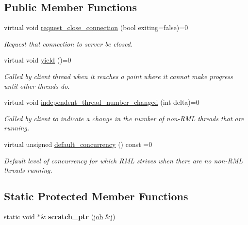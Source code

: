 \subsection*{Public Member Functions}
\begin{DoxyCompactItemize}
\item 
virtual void \hyperlink{classrml_1_1server_a3119d8d6c2d17932610653f6fda4f87a}{request\+\_\+close\+\_\+connection} (bool exiting=false)=0
\begin{DoxyCompactList}\small\item\em Request that connection to server be closed. \end{DoxyCompactList}\item 
\hypertarget{classrml_1_1server_a53e1efc4cb441f962e14af14e49b9fba}{}virtual void \hyperlink{classrml_1_1server_a53e1efc4cb441f962e14af14e49b9fba}{yield} ()=0\label{classrml_1_1server_a53e1efc4cb441f962e14af14e49b9fba}

\begin{DoxyCompactList}\small\item\em Called by client thread when it reaches a point where it cannot make progress until other threads do. \end{DoxyCompactList}\item 
virtual void \hyperlink{classrml_1_1server_a45154e61e7c6b60b51d53dacd1d03c2f}{independent\+\_\+thread\+\_\+number\+\_\+changed} (int delta)=0
\begin{DoxyCompactList}\small\item\em Called by client to indicate a change in the number of non-\/\+R\+M\+L threads that are running. \end{DoxyCompactList}\item 
virtual unsigned \hyperlink{classrml_1_1server_a0a4a81b5f45651f8c02f0227bbe49167}{default\+\_\+concurrency} () const  =0
\begin{DoxyCompactList}\small\item\em Default level of concurrency for which R\+M\+L strives when there are no non-\/\+R\+M\+L threads running. \end{DoxyCompactList}\end{DoxyCompactItemize}
\subsection*{Static Protected Member Functions}
\begin{DoxyCompactItemize}
\item 
\hypertarget{classrml_1_1server_adf8c397b5f0418bb224b7f45f9f13112}{}static void $\ast$\& {\bfseries scratch\+\_\+ptr} (\hyperlink{classrml_1_1server_ac812e52a5bb3de275e624c36997eac0e}{job} \&j)\label{classrml_1_1server_adf8c397b5f0418bb224b7f45f9f13112}

\end{DoxyCompactItemize}


